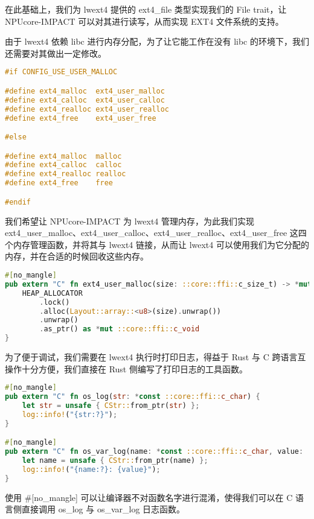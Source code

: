 在此基础上，我们为 lwext4 提供的 ext4_file 类型实现我们的 File trait，让 NPUcore-IMPACT 可以对其进行读写，从而实现 EXT4 文件系统的支持。

由于 lwext4 依赖 libc 进行内存分配，为了让它能工作在没有 libc 的环境下，我们还需要对其做出一定修改。

\begin{lstlisting}[language={C}, caption={管理 lwext4 内存}]
#if CONFIG_USE_USER_MALLOC

#define ext4_malloc  ext4_user_malloc
#define ext4_calloc  ext4_user_calloc
#define ext4_realloc ext4_user_realloc
#define ext4_free    ext4_user_free

#else

#define ext4_malloc  malloc
#define ext4_calloc  calloc
#define ext4_realloc realloc
#define ext4_free    free

#endif
\end{lstlisting}

我们希望让 NPUcore-IMPACT 为 lwext4 管理内存，为此我们实现 ext4_user_malloc、ext4_user_calloc、ext4_user_realloc、ext4_user_free 这四个内存管理函数，并将其与 lwext4 链接，从而让 lwext4 可以使用我们为它分配的内存，并在合适的时候回收这些内存。

\begin{lstlisting}[language={Rust}, caption={NPUcore-IMPACT 为 lwext4 分配内存}]
#[no_mangle]
pub extern "C" fn ext4_user_malloc(size: ::core::ffi::c_size_t) -> *mut ::core::ffi::c_void {
    HEAP_ALLOCATOR
        .lock()
        .alloc(Layout::array::<u8>(size).unwrap())
        .unwrap()
        .as_ptr() as *mut ::core::ffi::c_void
}
\end{lstlisting}

为了便于调试，我们需要在 lwext4 执行时打印日志，得益于 Rust 与 C 跨语言互操作十分方便，我们直接在 Rust 侧编写了打印日志的工具函数。

\begin{lstlisting}[language={Rust}, caption={在 lwext4 的 C 语言代码中打印日志}]
#[no_mangle]
pub extern "C" fn os_log(str: *const ::core::ffi::c_char) {
    let str = unsafe { CStr::from_ptr(str) };
    log::info!("{str:?}");
}

#[no_mangle]
pub extern "C" fn os_var_log(name: *const ::core::ffi::c_char, value: ::core::ffi::c_int) {
    let name = unsafe { CStr::from_ptr(name) };
    log::info!("{name:?}: {value}");
}
\end{lstlisting}

使用 \#[no_mangle] 可以让编译器不对函数名字进行混淆，使得我们可以在 C 语言侧直接调用 os_log 与 os_var_log 日志函数。
